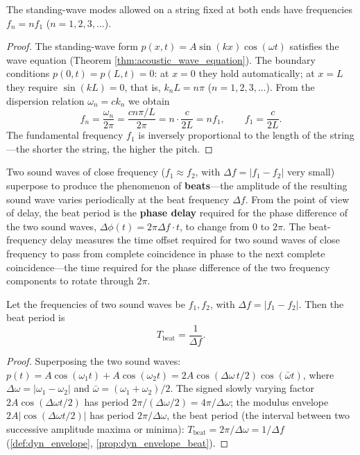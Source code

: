 \begin{proposition}\label{prop:string_harmonics}
The standing-wave modes allowed on a string fixed at both ends have frequencies $f_n = n f_1$ ($n = 1, 2, 3, \dots$).
\end{proposition}

\begin{proof}
The standing-wave form $p(x,t) = A\sin(kx)\cos(\omega t)$ satisfies the wave equation (Theorem \ref{thm:acoustic_wave_equation}). The boundary conditions $p(0,t) = p(L,t) = 0$: at $x=0$ they hold automatically; at $x=L$ they require $\sin(kL) = 0$, that is, $k_n L = n\pi$ ($n = 1,2,3,\dots$). From the dispersion relation $\omega_n = c k_n$ we obtain
\[
f_n = \frac{\omega_n}{2\pi} = \frac{c n\pi/L}{2\pi} = n\cdot\frac{c}{2L} = n f_1, \qquad f_1 = \frac{c}{2L}.
\]
The fundamental frequency $f_1$ is inversely proportional to the length of the string---the shorter the string, the higher the pitch.
\end{proof}

\begin{definition}\label{def:beat_delay}
Two sound waves of close frequency ($f_1 \approx f_2$, with $\Delta f = |f_1 - f_2|$ very small) superpose to produce the phenomenon of \textbf{beats}---the amplitude of the resulting sound wave varies periodically at the beat frequency $\Delta f$. From the point of view of delay, the beat period is the \textbf{phase delay} required for the phase difference of the two sound waves, $\Delta\phi(t) = 2\pi\Delta f \cdot t$, to change from $0$ to $2\pi$. The beat-frequency delay measures the time offset required for two sound waves of close frequency to pass from complete coincidence in phase to the next complete coincidence---the time required for the phase difference of the two frequency components to rotate through $2\pi$.
\end{definition}

\begin{proposition}\label{prop:beat_delay_formula}
Let the frequencies of two sound waves be $f_1, f_2$, with $\Delta f = |f_1 - f_2|$. Then the beat period is
\[
T_{\text{beat}} = \frac{1}{\Delta f}.
\]
\end{proposition}

\begin{proof}
Superposing the two sound waves: $p(t) = A\cos(\omega_1 t) + A\cos(\omega_2 t) = 2A\cos(\Delta\omega \, t/2)\cos(\bar{\omega} t)$, where $\Delta\omega = |\omega_1 - \omega_2|$ and $\bar{\omega} = (\omega_1 + \omega_2)/2$. The signed slowly varying factor $2A\cos(\Delta\omega t/2)$ has period $2\pi/(\Delta\omega/2)=4\pi/\Delta\omega$; the modulus envelope $2A|\cos(\Delta\omega t/2)|$ has period $2\pi/\Delta\omega$, the beat period (the interval between two successive amplitude maxima or minima): $T_{\text{beat}} = 2\pi/\Delta\omega = 1/\Delta f$ (\cref{def:dyn_envelope}, \cref{prop:dyn_envelope_beat}).
\end{proof}

